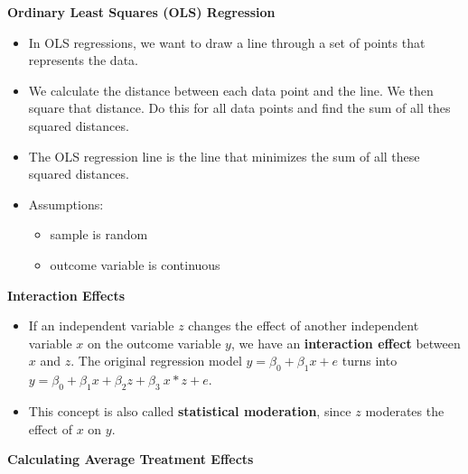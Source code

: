 \documentclass[]{book}
\providecommand{\tightlist}{%
  \setlength{\itemsep}{0pt}\setlength{\parskip}{0pt}}
\begin{document}
\textbf{Ordinary Least Squares (OLS) Regression}

\begin{itemize}
\tightlist
\item
  In OLS regressions, we want to draw a line through a set of points that represents the data.
\item
  We calculate the distance between each data point and the line. We then square that distance. Do this for all data points and find the sum of all thes squared distances.
\item
  The OLS regression line is the line that minimizes the sum of all these squared distances.
\item
  Assumptions:

  \begin{itemize}
  \tightlist
  \item
    sample is random
  \item
    outcome variable is continuous
  \end{itemize}
\end{itemize}

\textbf{Interaction Effects}

\begin{itemize}
\item
  If an independent variable \(z\) changes the effect of another independent variable \(x\) on the outcome variable \(y\), we have an \textbf{interaction effect} between \(x\) and \(z\). The original regression model \(y=\beta_0 +\beta_1 x + e\) turns into \(y=\beta_0 +\beta_1 x + \beta_2z + \beta_3~x*z + e\).
\item
  This concept is also called \textbf{statistical moderation}, since \(z\) moderates the effect of \(x\) on \(y\).
\end{itemize}

\textbf{Calculating Average Treatment Effects}
\end{document}

